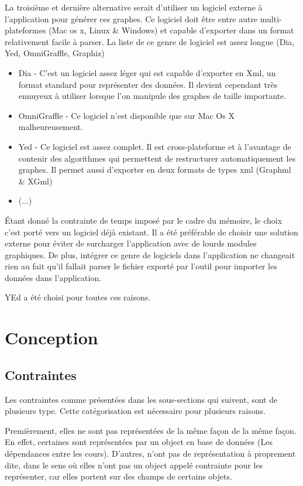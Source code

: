 La troisième et dernière alternative serait d'utiliser un logiciel externe à l'application pour générer ces graphes. Ce logiciel doit être entre autre multi-plateformes (Mac os x, Linux \& Windows) et capable d'exporter dans un format relativement facile à parser. La liste de ce genre de logiciel est assez longue (Dia, Yed, OmniGraffle, Graphiz)
\begin{itemize}
  \item Dia - C'est un logiciel assez léger qui est capable d'exporter en Xml, un format standard pour représenter des données. Il devient cependant très ennuyeux à utiliser lorsque l'on manipule des graphes de taille importante.
  \item OmniGraffle - Ce logiciel n'est disponible que sur Mac Os X malheureusement.
  \item Yed - Ce logiciel est assez complet. Il est cross-plateforme et à l'avantage de contenir des algorithmes qui permettent de restructurer automatiquement les graphes. Il permet aussi d'exporter en deux formats de types xml (Graphml \& XGml)
  \item (...)
\end{itemize}

Étant donné la contrainte de temps imposé par le cadre du mémoire, le choix c'est porté vers un logiciel déjà existant. Il a été préférable de choisir une solution externe pour éviter de surcharger l'application avec de lourds modules graphiques. De plus, intégrer ce genre de logiciels dans l'application ne changeait rien au fait qu'il fallait parser le fichier exporté par l'outil pour importer les données dans l'application.

YEd a été choisi pour toutes ces raisons. 
\clearpage
\section{Conception}
\subsection{Contraintes}
Les contraintes comme présentées dans les sous-sections qui suivent, sont de plusieurs type. Cette catégorisation est nécessaire pour plusieurs raisons. 

Premièrement, elles ne sont pas représentées de la même façon de la même façon. En effet, certaines sont représentées par un object en base de données (Les dépendances entre les cours). D'autres, n'ont pas de représentation à proprement dite, dans le sens où elles n'ont pas un object appelé contrainte pour les représenter, car elles portent sur des champs de certains objets. 

